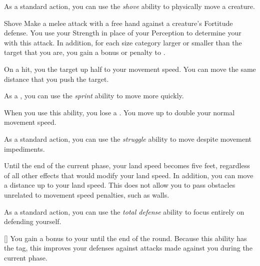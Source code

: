          As a standard action, you can use the \textit{shove} ability to physically move a creature.

        \begin{freeability}{Shove}\label{Shove}
            Make a melee attack with a free hand against a creature's Fortitude defense.
            You use your Strength in place of your Perception to determine your  with this attack.
            In addition, for each size category larger or smaller than the target that you are, you gain a  bonus or penalty to .

            On a hit, you  the target up half to your movement speed.
            You can move the same distance that you push the target.
        \end{freeability}

         As a , you can use the \textit{sprint} ability to move more quickly.

        \begin{freeability}{}
            When you use this ability, you lose a .
            You move up to double your normal movement speed.
        \end{freeability}

         As a standard action, you can use the \textit{struggle} ability to move despite movement impediments.

        \begin{freeability}{}
            Until the end of the current phase, your land speed becomes five feet, regardless of all other effects that would modify your land speed.
            In addition, you can move a distance up to your land speed.
            This does not allow you to pass obstacles unrelated to movement speed penalties, such as walls.
        \end{freeability}

         As a standard action, you can use the \textit{total defense} ability to focus entirely on defending yourself.

        \begin{freeability}{}[]
            You gain a  bonus to your  until the end of the round.
            Because this ability has the  tag, this improves your defenses against attacks made against you during the current phase.
        \end{freeability}

